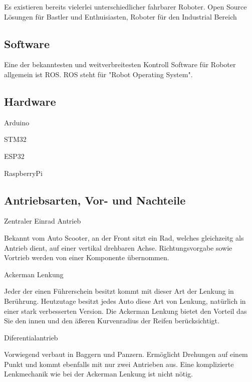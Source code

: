 \begin{flushleft}
Es existieren bereits vielerlei unterschiedlicher fahrbarer Roboter.
Open Source Lösungen für Bastler und Enthuisiasten, Roboter für den Industrial Bereich
\end{flushleft}

\subsection{Software}
Eine der bekanntesten und weitverbreitesten Kontroll Software für Roboter allgemein ist ROS.
ROS steht für "Robot Operating System".

\subsection{Hardware}
Arduino

STM32

ESP32

RaspberryPi

\subsection{Antriebsarten, Vor- und Nachteile}

\begin{flushleft}
Zentraler Einrad Antrieb

Bekannt vom Auto Scooter, an der Front sitzt ein Rad, welches gleichzeitg 
als Antrieb dient, auf einer vertikal drehbaren Achse.
Richtungsvorgabe sowie Vortrieb werden von einer Komponente übernommen.
\end{flushleft}

\begin{flushleft}
Ackerman Lenkung

Jeder der einen Führerschein besitzt kommt mit dieser Art der Lenkung in Berührung.
Heutzutage besitzt jedes Auto diese Art von Lenkung, natürlich in einer stark verbesserten Version.
Die Ackerman Lenkung bietet den Vorteil das Sie den innen und den äßeren Kurvenradius der Reifen berücksichtigt.
\end{flushleft}

\begin{flushleft}
Diferentialantrieb

Vorwiegend verbaut in Baggern und Panzern. Ermöglicht Drehungen auf einem Punkt und kommt ebenfalls 
mit nur zwei Antrieben aus. Eine komplizierte Lenkmechanik wie bei der Ackerman Lenkung ist nicht nötig.
\end{flushleft}

